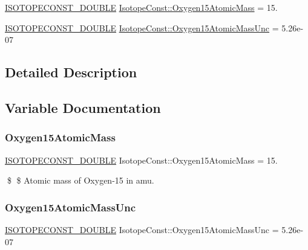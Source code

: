 \begin{DoxyCompactItemize}
\item 
\mbox{\hyperlink{group___isotope_const-_macros_ga8f45a7272ce02c0b4c65c44636ed719a}{I\+S\+O\+T\+O\+P\+E\+C\+O\+N\+S\+T\+\_\+\+D\+O\+U\+B\+LE}} \mbox{\hyperlink{group___isotope_const-_oxygen-_o15_ga0c167236c25650807bfe447efbaead26}{Isotope\+Const\+::\+Oxygen15\+Atomic\+Mass}} = 15.
\item 
\mbox{\hyperlink{group___isotope_const-_macros_ga8f45a7272ce02c0b4c65c44636ed719a}{I\+S\+O\+T\+O\+P\+E\+C\+O\+N\+S\+T\+\_\+\+D\+O\+U\+B\+LE}} \mbox{\hyperlink{group___isotope_const-_oxygen-_o15_ga00e69cc9090be6bb7f6501f8bf54c773}{Isotope\+Const\+::\+Oxygen15\+Atomic\+Mass\+Unc}} = 5.\+26e-\/07
\end{DoxyCompactItemize}


\subsection{Detailed Description}


\subsection{Variable Documentation}
\mbox{\label{group___isotope_const-_oxygen-_o15_ga0c167236c25650807bfe447efbaead26}} 
\subsubsection{\texorpdfstring{Oxygen15\+Atomic\+Mass}{Oxygen15AtomicMass}}
{\footnotesize\ttfamily \mbox{\hyperlink{group___isotope_const-_macros_ga8f45a7272ce02c0b4c65c44636ed719a}{I\+S\+O\+T\+O\+P\+E\+C\+O\+N\+S\+T\+\_\+\+D\+O\+U\+B\+LE}} Isotope\+Const\+::\+Oxygen15\+Atomic\+Mass = 15.}

\$ \$ Atomic mass of Oxygen-\/15 in amu. \mbox{\label{group___isotope_const-_oxygen-_o15_ga00e69cc9090be6bb7f6501f8bf54c773}} 
\subsubsection{\texorpdfstring{Oxygen15\+Atomic\+Mass\+Unc}{Oxygen15AtomicMassUnc}}
{\footnotesize\ttfamily \mbox{\hyperlink{group___isotope_const-_macros_ga8f45a7272ce02c0b4c65c44636ed719a}{I\+S\+O\+T\+O\+P\+E\+C\+O\+N\+S\+T\+\_\+\+D\+O\+U\+B\+LE}} Isotope\+Const\+::\+Oxygen15\+Atomic\+Mass\+Unc = 5.\+26e-\/07}

